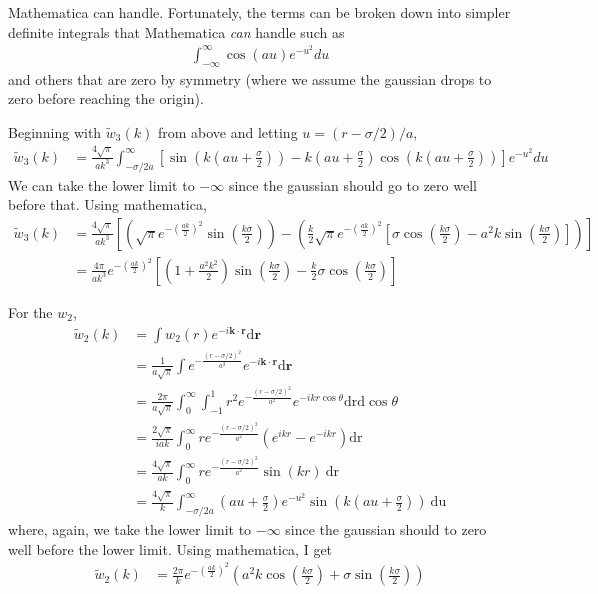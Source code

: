 \documentclass[letterpaper,twocolumn,amsmath,amssymb,prb]{revtex4-1}
\newcommand{\rr}{\textbf{r}}
\begin{document}
Mathematica can handle.  Fortunately, the terms can be broken down
into simpler definite integrals that Mathematica \emph{can} handle
such as
\begin{align}
  \int_{-\infty}^\infty \cos(a u)e^{-u^2}du
\end{align}
and others that are zero by symmetry (where we assume the gaussian
drops to zero before reaching the origin).
\begin{widetext}
Beginning with $\tilde{w}_3(k)$ from above and letting $u = (r-\sigma/2)/a,$
  \begin{align}
    \tilde{w}_3(k)
    &=  \frac{4\sqrt{\pi}}{ak^3}\int_{-\sigma/2a}^\infty \left[ \sin(k(au+\frac{\sigma}{2}))
      - k(au + \frac{\sigma}{2}) \cos(k(au+\frac{\sigma}{2}))\right] e^{-u^2} du
  \end{align}
We can take the lower limit to $-\infty$ since the gaussian should go
to zero well before that. Using mathematica,
  \begin{align}
    \tilde{w}_3(k) &= \frac{4\sqrt{\pi}}{ak^3}
    \left[ \left(\sqrt{\pi}e^{-\left(\frac{ak}{2}\right)^2}
    \sin\left(\frac{k\sigma}{2}\right) \right) - \left( \frac{k}{2}
    \sqrt{\pi}e^{-\left(\frac{ak}{2}\right)^2} \left[\sigma
      \cos\left(\frac{k \sigma}{2}\right) - a^2 k \sin\left(\frac{k \sigma}{2}\right)
      \right] \right)\right] \\ 
    &= \frac{4\pi}{ak^3}e^{-\left(\frac{ak}{2}\right)^2}\left[ \left(1 + \frac{a^2k^2}{2} \right)
      \sin\left(\frac{k\sigma}{2}\right) - \frac{k}{2} \sigma\cos\left(\frac{k \sigma}{2}\right)  \right]
  \end{align}
\end{widetext}

For the $w_2$,
\begin{align}
  \tilde{w}_2(k) &= \int w_2(r) e^{-i \mathbf{k} \cdot
    \rr} \textrm{d} \rr \\
  &= \frac{1}{a\sqrt{\pi}}\int e^{-\frac{(r-\sigma/2)^2}{a^2}} e^{-i \mathbf{k} \cdot
    \rr} \textrm{d} \rr \\
  &= \frac{2\pi}{a\sqrt{\pi}}\int_0^\infty \int_{-1}^1 r^2 e^{-\frac{(r-\sigma/2)^2}{a^2}}
  e^{-ikr\cos{\theta}} \textrm{drd}\cos{\theta} \\
  &= \frac{2\sqrt{\pi}}{iak} \int_0^\infty r e^{-\frac{(r-\sigma/2)^2}{a^2}}
  \left(e^{ikr} - e^{-ikr}\right) \textrm{dr} \\
  &= \frac{4\sqrt{\pi}}{ak} \int_0^\infty r e^{-\frac{(r-\sigma/2)^2}{a^2}}
  \sin(kr) ~\textrm{dr} \\
  &= \frac{4\sqrt{\pi}}{k} \int_{-\sigma/2a}^\infty \left(au +
  \frac{\sigma}{2}\right) e^{-u^2} \sin\left(k\left(au +
  \frac{\sigma}{2}\right)\right) ~\textrm{du}
\end{align}
where, again, we take the lower limit to $-\infty$ since the gaussian
should to zero well before the lower limit. Using mathematica, I get
\begin{align}
  \tilde{w}_2(k) &=\frac{2\pi}{k} e^{-\left(\frac{ak}{2} \right)^2} \left(a^2 k
  \cos\left(\frac{k\sigma}{2}\right) +\sigma \sin\left(\frac{k\sigma}{2}\right) \right)
\end{align}
\end{document}
